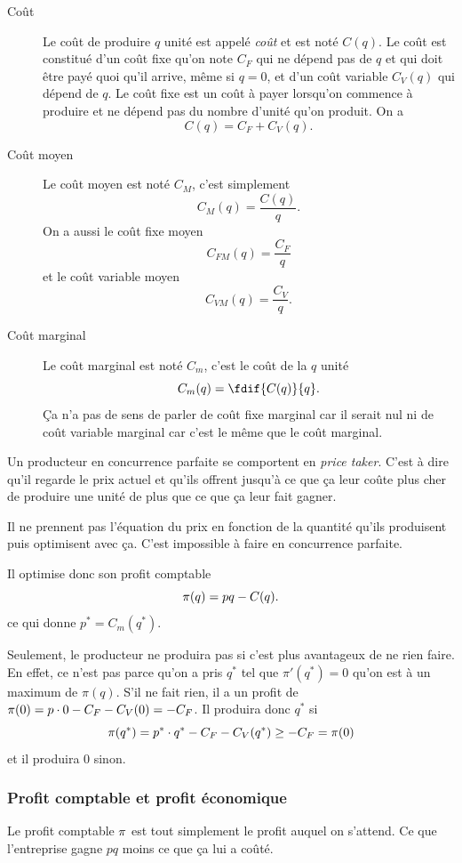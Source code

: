 \begin{description}
  \item[Coût]
    Le coût de produire $q$ unité est appelé \emph{coût} et est noté $C(q)$.
    Le coût est constitué d'un coût fixe qu'on note $C_F$ qui ne dépend
    pas de $q$ et qui doit être payé quoi qu'il arrive,
    même si $q = 0$, et d'un coût
    variable $C_V(q)$ qui dépend de $q$.
    Le coût fixe est un coût à payer lorsqu'on commence à produire
    et ne dépend pas du nombre d'unité qu'on produit. On a
    \[ C(q) = C_F + C_V(q). \]
  \item[Coût moyen]
    Le coût moyen est noté $C_M$, c'est simplement
    \[ C_M(q) = \frac{C(q)}{q}. \]
    On a aussi le coût fixe moyen
    \[ C_{FM}(q) = \frac{C_F}{q} \]
    et le coût variable moyen
    \[ C_{VM}(q) = \frac{C_V}{q}. \]
  \item[Coût marginal]
    Le coût marginal est noté $C_m$, c'est le coût de la $q$\ieme{} unité
    \[ C_m(q) = \fdif{C(q)}{q}. \]
    Ça n'a pas de sens de parler de coût fixe marginal car il serait nul
    ni de coût variable marginal car c'est le même que le coût marginal.
\end{description}

Un producteur en concurrence parfaite se comportent en \emph{price taker}.
C'est à dire qu'il regarde le prix actuel et qu'ils offrent jusqu'à
ce que ça leur coûte plus cher de produire une unité de plus que ce que
ça leur fait gagner.

Il ne prennent pas l'équation du prix en fonction de la quantité
qu'ils produisent puis optimisent avec ça.
C'est impossible à faire en concurrence parfaite.

Il optimise donc son profit comptable
\[ \pi(q) = pq - C(q). \]
ce qui donne $p^* = C_m(q^*)$.

Seulement, le producteur ne produira pas si c'est plus avantageux de
ne rien faire.
En effet, ce n'est pas parce qu'on a pris $q^*$ tel que $\pi'(q^*) = 0$ qu'on
est à un maximum de $\pi(q)$.
S'il ne fait rien, il a un profit de
$\pi(0) = p \cdot 0 - C_F - C_V(0) = -C_F$.
Il produira donc $q^*$ si
\[ \pi(q^*) = p^* \cdot q^* - C_F - C_V(q^*) \geq -C_F = \pi(0) \]
et il produira 0 sinon.

\subsubsection{Profit comptable et profit économique}
Le profit comptable $\pi$ est tout simplement le profit auquel on s'attend.
Ce que l'entreprise gagne $pq$ moins ce que ça lui a coûté.

